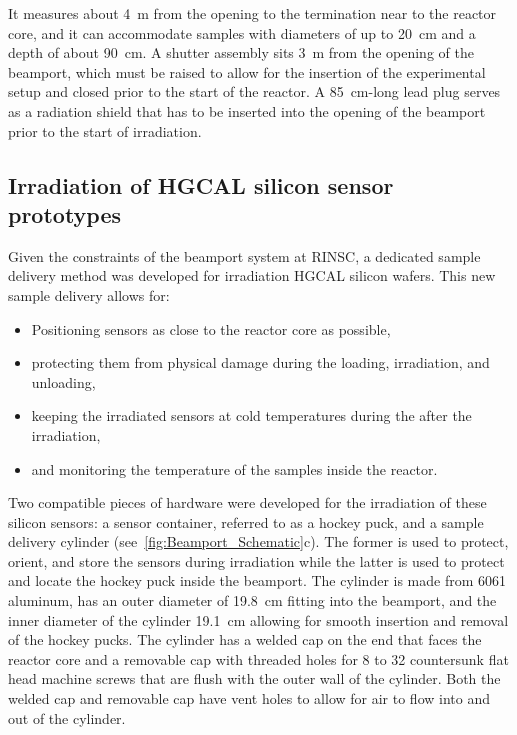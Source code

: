 It measures about \SI{4}{\metre} from the opening to the termination near to the reactor core, and it can accommodate samples with diameters of up to \SI{20}{\centi\metre} and a depth of about \SI{90}{\centi\metre}.
A shutter assembly sits \SI{3}{\metre} from the opening of the beamport, which must be raised to allow for the insertion of the experimental setup and closed prior to the start of the reactor.
A \SI{85}{\centi\metre}-long lead plug serves as a radiation shield that has to be inserted into the opening of the beamport prior to the start of irradiation.

\subsection{Irradiation of HGCAL silicon sensor prototypes}
\label{subsec:irradiation}
Given the constraints of the beamport system at RINSC, a dedicated sample delivery method was developed for irradiation HGCAL silicon wafers.
This new sample delivery allows for:
\begin{itemize}
  \item Positioning sensors as close to the reactor core as possible,
  \item protecting them from physical damage during the loading, irradiation, and unloading,
  \item keeping the irradiated sensors at cold temperatures during the after the irradiation,
  \item and monitoring the temperature of the samples inside the reactor.
\end{itemize}
Two compatible pieces of hardware were developed for the irradiation of these silicon sensors: a sensor container, referred to as a hockey puck, and a sample delivery cylinder (see~\ref{fig:Beamport_Schematic}c). 
The former is used to protect, orient, and store the sensors during irradiation while the latter is used to protect and locate the hockey puck inside the beamport.\newline
The cylinder is made from 6061 aluminum, has an outer diameter of \SI{19.8}{\centi\metre} fitting into the beamport, and the inner diameter of the cylinder \SI{19.1}{\centi\metre} allowing for smooth insertion and removal of the hockey pucks.
The cylinder has a welded cap on the end that faces the reactor core and a removable cap with threaded holes for 8 to 32 countersunk flat head machine screws that are flush with the outer wall of the cylinder. 
Both the welded cap and removable cap have vent holes to allow for air to flow into and out of the cylinder.

